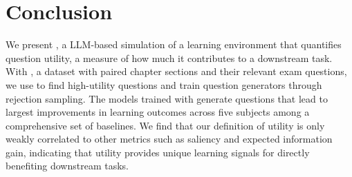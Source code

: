\section{Conclusion}

We present \ours, a LLM-based simulation of a learning environment that quantifies question utility, a measure of how much it contributes to a downstream task. 
With \ourdata, a dataset with paired chapter sections and their relevant exam questions, we use \ours to find high-utility questions and train question generators through rejection sampling. 
The models trained with \ours generate questions that lead to largest improvements in learning outcomes across five subjects among a comprehensive set of baselines. 
We find that our definition of utility is only weakly correlated to other metrics such as saliency and expected information gain, indicating that utility provides unique learning signals for directly benefiting downstream tasks.  